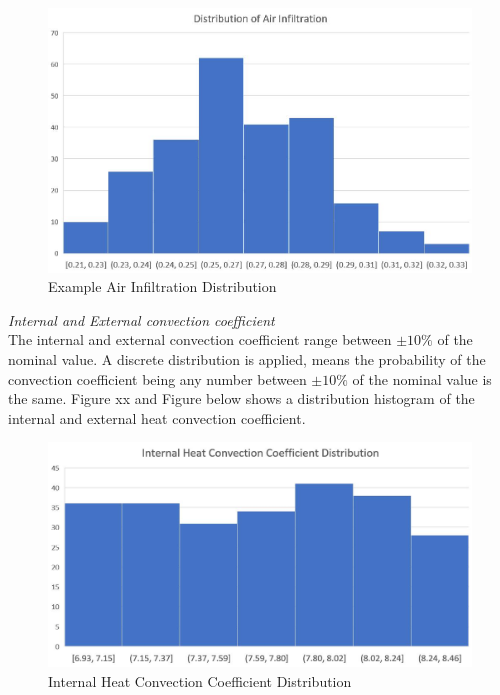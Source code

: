 \documentclass[11pt, a4paper]{article}
\theoremstyle{definition}
\begin{document}
			\begin{figure}[H]
			\centering
			\includegraphics[scale=0.5]{Example_Normal_Distribution.jpg}
			\caption{Example Air Infiltration Distribution}
			\label{fig:EXPAirInfiltration_Sumatra}
			\end{figure}
		
		\textit{Internal and External convection coefficient}\\
			The internal and external convection coefficient range between $\pm 10\%$ of the nominal value.
			A discrete distribution is applied, means the probability of the convection coefficient being any number between $\pm 10\%$ of the nominal value is the same. Figure xx and Figure below shows a distribution histogram of the internal and external heat convection coefficient.\\

			\begin{figure}[H]
			\centering
			\includegraphics[scale=0.5]{Hongger_InConvDist.jpg}
			\caption{Internal Heat Convection Coefficient Distribution}
			\label{fig:HonggerIntConvDist}
			\end{figure}
			
\end{document}
